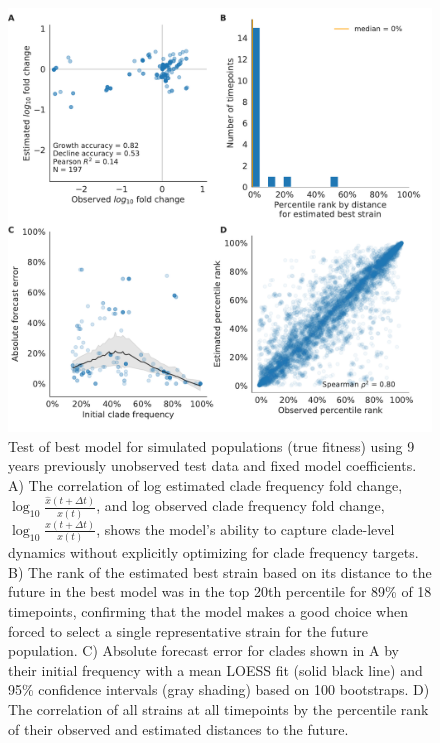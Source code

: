 \begin{figure}[p]
  \begin{center}
  \includegraphics[width=\textwidth]{figures/test-of-best-model-for-simulated-populations.pdf}
  \caption{
  Test of best model for simulated populations (true fitness) using 9 years previously unobserved test data and fixed model coefficients.
  A) The correlation of log estimated clade frequency fold change, $\log_{10}{\frac{\hat{x}(t + \Delta{t})}{x(t)}}$, and log observed clade frequency fold change, $\log_{10}{\frac{x(t + \Delta{t})}{x(t)}}$, shows the model's ability to capture clade-level dynamics without explicitly optimizing for clade frequency targets.
  B) The rank of the estimated best strain based on its distance to the future in the best model was in the top 20th percentile for 89\% of 18 timepoints, confirming that the model makes a good choice when forced to select a single representative strain for the future population.
  C) Absolute forecast error for clades shown in A by their initial frequency with a mean LOESS fit (solid black line) and 95\% confidence intervals (gray shading) based on 100 bootstraps.
  D) The correlation of all strains at all timepoints by the percentile rank of their observed and estimated distances to the future.
  }
  \label{fig:test_of_best_model_for_simulated_populations}
  \end{center}
\end{figure}

